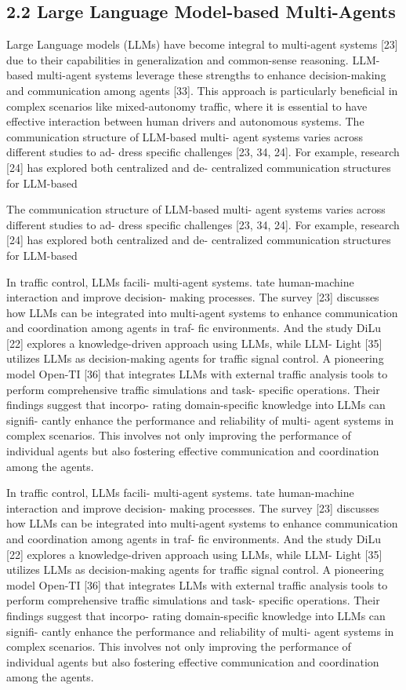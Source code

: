 \documentclass[12pt]{article}
\begin{document}
\subsection{2.2 Large Language Model-based Multi-Agents}

Large Language models (LLMs) have become integral
to multi-agent systems [23] due to their capabilities
in generalization and common-sense reasoning. LLM-
based multi-agent systems leverage these strengths to
enhance decision-making and communication among
agents [33]. This approach is particularly beneficial in
complex scenarios like mixed-autonomy traffic, where it
is essential to have effective interaction between human
drivers and autonomous systems.
The communication structure of LLM-based multi-
agent systems varies across different studies to ad-
dress specific challenges
[23, 34, 24]. For example,
research [24] has explored both centralized and de-
centralized communication structures for LLM-based


The communication structure of LLM-based multi-
agent systems varies across different studies to ad-
dress specific challenges
[23, 34, 24]. For example,
research [24] has explored both centralized and de-
centralized communication structures for LLM-based


In traffic control, LLMs facili-
multi-agent systems.
tate human-machine interaction and improve decision-
making processes. The survey [23] discusses how LLMs
can be integrated into multi-agent systems to enhance
communication and coordination among agents in traf-
fic environments. And the study DiLu [22] explores
a knowledge-driven approach using LLMs, while LLM-
Light [35] utilizes LLMs as decision-making agents for
traffic signal control. A pioneering model Open-TI [36]
that integrates LLMs with external traffic analysis tools
to perform comprehensive traffic simulations and task-
specific operations. Their findings suggest that incorpo-
rating domain-specific knowledge into LLMs can signifi-
cantly enhance the performance and reliability of multi-
agent systems in complex scenarios. This involves not
only improving the performance of individual agents but
also fostering effective communication and coordination
among the agents.


In traffic control, LLMs facili-
multi-agent systems.
tate human-machine interaction and improve decision-
making processes. The survey [23] discusses how LLMs
can be integrated into multi-agent systems to enhance
communication and coordination among agents in traf-
fic environments. And the study DiLu [22] explores
a knowledge-driven approach using LLMs, while LLM-
Light [35] utilizes LLMs as decision-making agents for
traffic signal control. A pioneering model Open-TI [36]
that integrates LLMs with external traffic analysis tools
to perform comprehensive traffic simulations and task-
specific operations. Their findings suggest that incorpo-
rating domain-specific knowledge into LLMs can signifi-
cantly enhance the performance and reliability of multi-
agent systems in complex scenarios. This involves not
only improving the performance of individual agents but
also fostering effective communication and coordination
among the agents.
\end{document}
